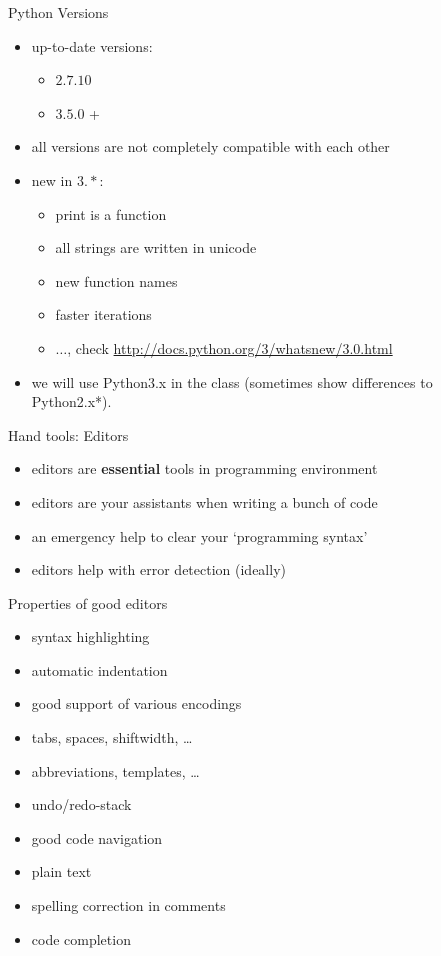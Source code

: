 \documentclass[notes=hide]{beamer}
\begin{document}
\begin{frame}{Python Versions}
 \begin{itemize}
	\item up-to-date versions:
	\begin{itemize}
		\item $2.7.10$
		\item $3.5.0$ +
	\end{itemize}
	\item all versions are not completely compatible with each other
	\item new in $3.*$:
	\begin{itemize}
	\item print is a function
	\item all strings are written in unicode
	\item new function names
	\item faster iterations
	\item $\ldots$, check \url{http://docs.python.org/3/whatsnew/3.0.html}
	\end{itemize}
	\item we will use Python3.x in the class (sometimes show differences to Python2.x*).
 \end{itemize}
\end{frame}

\begin{frame}{Hand tools: Editors}
  \begin{itemize}
     \item editors are \textbf{essential} tools in programming environment
     \item editors are your assistants when writing a bunch of code
     \item an emergency help to clear your `programming syntax'
     \item editors help with error detection (ideally)
  \end{itemize}
\end{frame}

\begin{frame}{Properties of good editors}
  \begin{itemize}
    \item syntax highlighting
    \item automatic indentation
    \item good support of various encodings
    \item tabs, spaces, shiftwidth, \ldots
    \item abbreviations, templates, \ldots
    \item undo/redo-stack
    \item good code navigation
    \item plain text
    \item spelling correction in comments
    \item code completion
  \end{itemize}
\end{frame}
\end{document}
